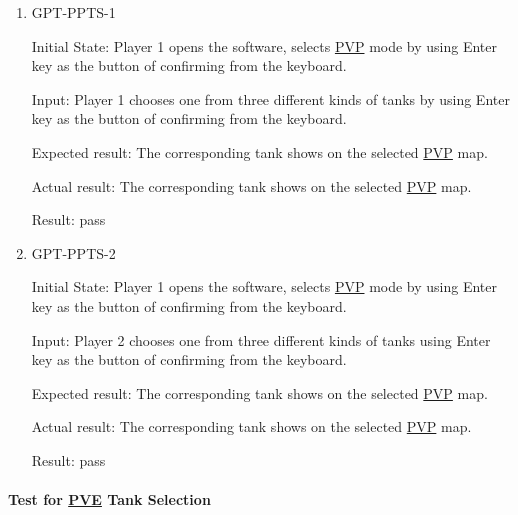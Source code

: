 \documentclass[12pt, titlepage]{article}
\begin{document}
\begin{enumerate}

\item{GPT-PPTS-1\\}
					
Initial State: Player 1 opens the software, selects \underline{PVP} mode by using Enter key as the button of confirming from the keyboard.
					
Input: Player 1 chooses one from three different kinds of tanks by using Enter key as the button of confirming from the keyboard.
					
Expected result: The corresponding tank shows on the selected \underline{PVP} map.
					
Actual result: The corresponding tank shows on the selected \underline{PVP} map.

Result: pass

\item{GPT-PPTS-2\\}
					
Initial State: Player 1 opens the software, selects \underline{PVP} mode by using Enter key as the button of confirming from the keyboard.
					
Input: Player 2 chooses one from three different kinds of tanks using Enter key as the button of confirming from the keyboard.
					
Expected result: The corresponding tank shows on the selected \underline{PVP} map.
					
Actual result: The corresponding tank shows on the selected \underline{PVP} map.

Result: pass

\end{enumerate}

\paragraph{Test for \underline{PVE} Tank Selection}
\end{document}
